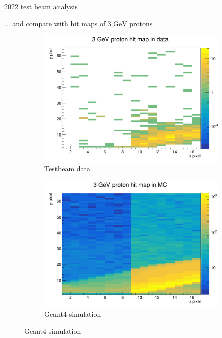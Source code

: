 \documentclass[xcolor={dvipsnames}]{beamer}
\begin{document}
\begin{frame}{2022 test beam analysis}
  \begin{center}
    \Large{... and compare with hit maps of $\SI{3}{\giga\eV}$ protons}
  \end{center}
  \begin{figure}
    \centering
    \begin{subfigure}{0.5\textwidth}
      \includegraphics[width = 1.0\textwidth]{Figs/HitMap_Pos8_Proton_3GeV_Data.png}
      \caption{Testbeam data}
    \end{subfigure}%
    \begin{subfigure}{0.5\textwidth}
      \includegraphics[width = 1.0\textwidth]{Figs/HitMap_Pos8_Proton_3GeV_MC.png}
      \caption{Geant4 simulation}
    \end{subfigure}%
  \end{figure}
\end{frame}
\end{document}
